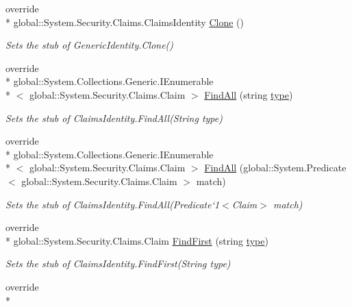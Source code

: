 \begin{DoxyCompactItemize}
override \\*
global\-::\-System.\-Security.\-Claims.\-Claims\-Identity \hyperlink{class_system_1_1_security_1_1_principal_1_1_fakes_1_1_stub_generic_identity_a41514ec2bfb52aaeeaf21fda75298d43}{Clone} ()
\begin{DoxyCompactList}\small\item\em Sets the stub of Generic\-Identity.\-Clone()\end{DoxyCompactList}\item 
override \\*
global\-::\-System.\-Collections.\-Generic.\-I\-Enumerable\\*
$<$ global\-::\-System.\-Security.\-Claims.\-Claim $>$ \hyperlink{class_system_1_1_security_1_1_principal_1_1_fakes_1_1_stub_generic_identity_ae4f97f49339a2be0ab4fc6d0e6c86c36}{Find\-All} (string \hyperlink{jquery-1_810_82-vsdoc_8js_a3940565e83a9bfd10d95ffd27536da91}{type})
\begin{DoxyCompactList}\small\item\em Sets the stub of Claims\-Identity.\-Find\-All(\-String type)\end{DoxyCompactList}\item 
override \\*
global\-::\-System.\-Collections.\-Generic.\-I\-Enumerable\\*
$<$ global\-::\-System.\-Security.\-Claims.\-Claim $>$ \hyperlink{class_system_1_1_security_1_1_principal_1_1_fakes_1_1_stub_generic_identity_a53ca259ec4044f27d903e95a5a80ee97}{Find\-All} (global\-::\-System.\-Predicate$<$ global\-::\-System.\-Security.\-Claims.\-Claim $>$ match)
\begin{DoxyCompactList}\small\item\em Sets the stub of Claims\-Identity.\-Find\-All(Predicate`1$<$Claim$>$ match)\end{DoxyCompactList}\item 
override \\*
global\-::\-System.\-Security.\-Claims.\-Claim \hyperlink{class_system_1_1_security_1_1_principal_1_1_fakes_1_1_stub_generic_identity_a06eba98bafe3cc5861d12ef7ce84bb24}{Find\-First} (string \hyperlink{jquery-1_810_82-vsdoc_8js_a3940565e83a9bfd10d95ffd27536da91}{type})
\begin{DoxyCompactList}\small\item\em Sets the stub of Claims\-Identity.\-Find\-First(\-String type)\end{DoxyCompactList}\item 
override \\*

\end{DoxyCompactItemize}
